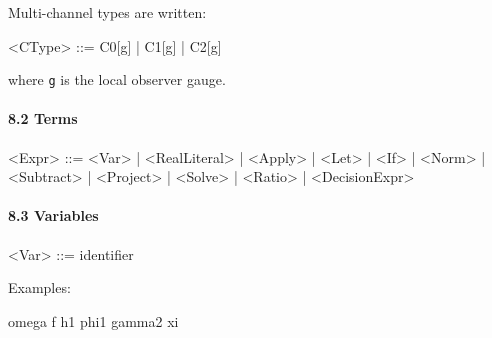 \documentclass[
]{article}
\newenvironment{Shaded}{\begin{snugshade}}{\end{snugshade}}
\newcommand{\NormalTok}[1]{\textcolor[rgb]{0.12,0.11,0.11}{#1}}
\begin{document}
Multi-channel types are written:

\begin{Shaded}
\begin{Highlighting}[]
\NormalTok{\textless{}CType\textgreater{} ::=}
\NormalTok{    C0[g]}
\NormalTok{  | C1[g]}
\NormalTok{  | C2[g]}
\end{Highlighting}
\end{Shaded}

where \texttt{g} is the local observer gauge.

\paragraph{8.2 Terms}\label{terms}

\begin{Shaded}
\begin{Highlighting}[]
\NormalTok{\textless{}Expr\textgreater{} ::=}
\NormalTok{    \textless{}Var\textgreater{}}
\NormalTok{  | \textless{}RealLiteral\textgreater{}}
\NormalTok{  | \textless{}Apply\textgreater{}}
\NormalTok{  | \textless{}Let\textgreater{}}
\NormalTok{  | \textless{}If\textgreater{}}
\NormalTok{  | \textless{}Norm\textgreater{}}
\NormalTok{  | \textless{}Subtract\textgreater{}}
\NormalTok{  | \textless{}Project\textgreater{}}
\NormalTok{  | \textless{}Solve\textgreater{}}
\NormalTok{  | \textless{}Ratio\textgreater{}}
\NormalTok{  | \textless{}DecisionExpr\textgreater{}}
\end{Highlighting}
\end{Shaded}

\paragraph{8.3 Variables}\label{variables}

\begin{Shaded}
\begin{Highlighting}[]
\NormalTok{\textless{}Var\textgreater{} ::= identifier}
\end{Highlighting}
\end{Shaded}

Examples:

\begin{Shaded}
\begin{Highlighting}[]
\NormalTok{omega}
\NormalTok{f}
\NormalTok{h1}
\NormalTok{phi1}
\NormalTok{gamma2}
\NormalTok{xi}
\end{Highlighting}
\end{Shaded}
\end{document}
